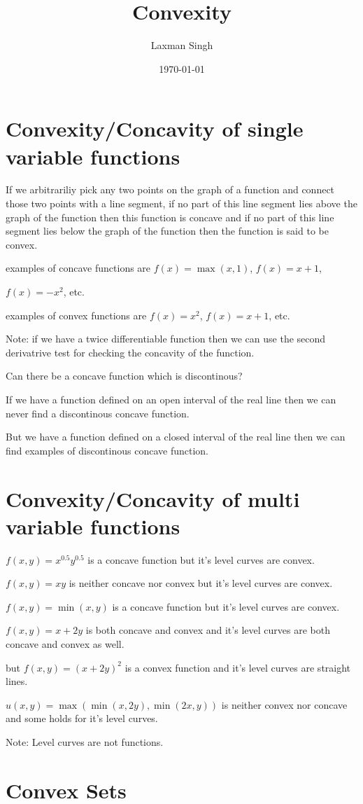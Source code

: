 \documentclass[12pt,a4paper]{article}
\author{Laxman Singh}
\date{\today}
\title{Convexity}
\begin{document}
\section{Convexity/Concavity of single variable functions} 
If we arbitrariliy pick any two points on the graph of a function and connect those two points
 with a line segment, if no part of this line segment lies above the graph of the function then
  this function is concave and if no part of this line segment lies below the graph of the 
  function then the function is said to be convex.

examples of concave functions are \(f(x)=\max(x,1)\), \(f(x)=x+1\), 

\(f(x)=-x^2\), etc. 

examples of convex functions are \(f(x)=x^2\), \(f(x)=x+1\), etc.

Note: if we have a twice differentiable function then we can use the second derivatrive test
 for checking the concavity of the function.

Can there be a concave function which is discontinous?

If we have a function defined on an open interval of the real line then we can never find a
discontinous concave function.

But we have a function defined on a closed interval of the real line then we can find examples
of discontinous concave function.

\section{Convexity/Concavity of multi variable functions}
\(f(x,y)=x^{0.5}y^{0.5}\) is a concave function but it's level curves are convex.

\(f(x,y)=xy\) is neither concave nor convex but it's level curves are convex.

\(f(x,y)=\min(x,y)\) is a concave function but it's level curves are convex. 

\(f(x,y)= x+2y\) is both concave and convex and it's level curves are both concave and convex
as well.

but \(f(x,y)= (x+2y)^2\) is a convex function and it's level curves are straight lines.

\(u(x,y)=\max(\min(x,2y),\min(2x,y))\) is neither convex nor concave and some holds for it's
level curves.

Note: Level curves are not functions. 
\section{Convex Sets} 
\end{document}
